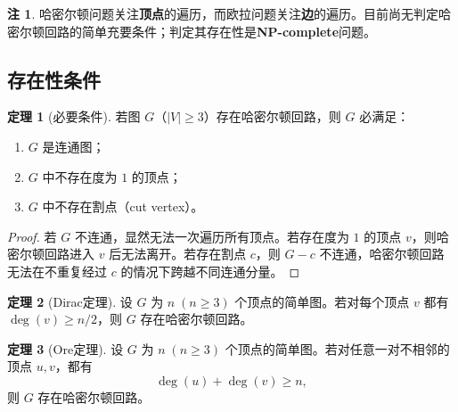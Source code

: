 \documentclass[UTF8,11pt,a4paper]{ctexbook}   %
\theoremstyle{definition}
\newtheorem{theorem}{定理}[section]
\newtheorem{remark}{注}[section]
\begin{document}
\begin{remark}
哈密尔顿问题关注\textbf{顶点}的遍历，而欧拉问题关注\textbf{边}的遍历。目前尚无判定哈密尔顿回路的简单充要条件；判定其存在性是\textbf{NP-complete}问题。
\end{remark}

\subsection{存在性条件}

\begin{theorem}[必要条件]
若图 $G$（$|V|\ge 3$）存在哈密尔顿回路，则 $G$ 必满足：
\begin{enumerate}
    \item $G$ 是连通图；
    \item $G$ 中不存在度为 $1$ 的顶点；
    \item $G$ 中不存在割点（cut vertex）。
\end{enumerate}
\end{theorem}

\begin{proof}
若 $G$ 不连通，显然无法一次遍历所有顶点。若存在度为 $1$ 的顶点 $v$，则哈密尔顿回路进入 $v$ 后无法离开。若存在割点 $c$，则 $G-c$ 不连通，哈密尔顿回路无法在不重复经过 $c$ 的情况下跨越不同连通分量。
\end{proof}

\begin{theorem}[Dirac定理]
设 $G$ 为 $n\;(n\ge 3)$ 个顶点的简单图。若对每个顶点 $v$ 都有 $\deg(v)\ge n/2$，则 $G$ 存在哈密尔顿回路。
\end{theorem}

\begin{theorem}[Ore定理]
设 $G$ 为 $n\;(n\ge 3)$ 个顶点的简单图。若对任意一对不相邻的顶点 $u,v$，都有
\[
\deg(u)+\deg(v)\ge n,
\]
则 $G$ 存在哈密尔顿回路。
\end{theorem}
\end{document}
